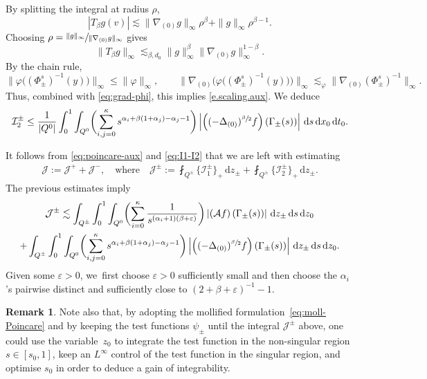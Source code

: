 \documentclass[10pt,a4paper]{amsart}
\let\epsilon\varepsilon
\theoremstyle{definition}
\newtheorem{remark}[theorem]{Remark}
\newcommand{\cA}{{\mathcal A}}
\newcommand{\cI}{{\mathcal I}}
\newcommand{\cJ}{{\mathcal J}}
\newcommand{\dd}{{\, \mathrm d}}
\let\var\varepsilon
\begin{document}
By splitting the integral at radius \(\rho\),
\[
|T_\beta g(v)|
\lesssim \|\nabla_{(0)}g\|_\infty\rho^\beta+\|g\|_\infty\rho^{\beta-1}.
\]
Choosing \(\rho=\sfrac{\|g\|_\infty}{\|\nabla_{(0)}g\|_\infty}\) gives
\[
\|T_\beta g\|_\infty
\lesssim_{\beta,d_0}
\|g\|_\infty^\beta
\|\nabla_{(0)}g\|_\infty^{1-\beta}.
\]
By the chain rule,
\[
\|\varphi\big((\Phi_\pm^s)^{-1}(y)\big)\|_\infty\leq \|\varphi\|_\infty,
\qquad
\|\nabla_{(0)}\Big(\varphi\big((\Phi_\pm^s)^{-1}(y)\big)\Big)\|_\infty
\lesssim_\varphi
\|\nabla_{(0)}(\Phi_\pm^s)^{-1}\|_\infty.
\]
Thus, combined with \eqref{eq:grad-phi}, this implies \eqref{e.scaling.aux}.
We deduce
\begin{equation*}
\cI_2^\pm
\le \frac{1}{\vert Q^0\vert }\int_0^1 \int_{Q^0} \biggl(\sum_{i,j=0} ^\kappa s^{ \alpha_i +\beta(1+\alpha_j) - \alpha_j - 1} \biggr) \left|
\left((-\Delta_{(0)})^{\sfrac{\beta}{2}} f\right)\left(
\Gamma_\pm(s) \right) \right| \dd s \dd x_0 \dd t_0.
\end{equation*}

It follows from \eqref{eq:poincare-aux} and \eqref{eq:I1-I2} that
we are left with estimating
{
\begin{align*}
\cJ := \cJ^+ + \cJ^-, \quad \text{where} \quad
\cJ^{\pm} := \fint_{Q^\pm} \big\{\cI^\pm_1\big\}_+ \dd
z_\pm + \fint_{Q^\pm} \big\{\cI^\pm_2\big\}_+ \dd
z_\pm.
\end{align*}
}
The previous estimates imply
\begin{multline}
\label{eq:J-gen}
{\cJ^{\pm}}\lesssim \int_{Q^\pm} \int_0^1 \int_{Q^0}
\biggl(\sum_{i = 0}^\kappa \frac{1}{ s^{(\alpha_i+1)(\beta+\epsilon)}}
\biggr) \left| \left(\cA f \right) (\Gamma_\pm(s))\right|
\dd z_\pm \dd s
\dd z_0 \\
+ \int_{Q^\pm} \int_0^1\int_{Q^0} \biggl(\sum_{i,j =
0}^\kappa s^{\alpha_i +\beta(1+\alpha_j) - \alpha_j -1} \biggr) \left| \left(
(-\Delta_{(0)})^{\sfrac{\beta}{2}}f\right)\left(
\Gamma_\pm(s) \right) \right| \dd z_\pm \dd s \dd z_0.
\end{multline}
Given some $\var>0$, we~first choose $\epsilon>0$ sufficiently small
and then choose the $\alpha_i$'s pairwise distinct and sufficiently
close to $(2+\beta+\epsilon)^{-1}-1$.

\begin{remark}
\label{rmk_gain_int}
Note also that, by adopting the mollified
formulation~\eqref{eq:moll-Poincare} and by keeping the test
functions $\psi_\pm$ until the integral {$\cJ^{\pm}$} above, one could
use the variable~$z_0$ to integrate the test function in the
non-singular region $s \in [s_0,1]$, keep an $L ^\infty$ control
of the test function in the singular region, and optimise
$s_0$ in order to deduce a gain of integrability.
\end{remark}
\end{document}
